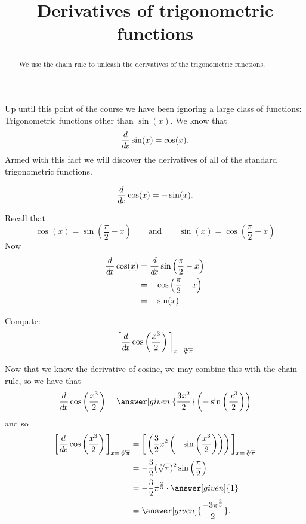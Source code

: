 \documentclass{ximera}
\title[Dig-In:]{Derivatives of trigonometric functions}
\begin{document}
\begin{abstract}
  We use the chain rule to unleash the derivatives of the
  trigonometric functions.
\end{abstract}
\maketitle


Up until this point of the course we have been ignoring a large class
of functions: Trigonometric functions other than $\sin(x)$. We know
that
\[
\frac{d}{\mathop{}\!d\! x} \sin(x) = \cos(x).
\]
Armed with this fact we will discover the derivatives of all of the
standard trigonometric functions.



\begin{theorem}
\[
\frac{d}{\mathop{}\!d\! x} \cos(x) = -\sin(x).
\]
\begin{explanation}
Recall that
\[
\cos(x) = \sin\left(\frac{\pi}{2}-x\right)\qquad\text{and}\qquad \sin(x) = \cos\left(\frac{\pi}{2}-x\right)
\]
Now
\begin{align*}
\frac{d}{\mathop{}\!d\! x} \cos(x) &= \frac{d}{\mathop{}\!d\! x} \sin\left(\frac{\pi}{2}-x\right)\\
&=-\cos\left(\frac{\pi}{2}-x\right) \\
&= -\sin(x).
\end{align*}
\end{explanation}
\end{theorem}

\begin{example}
Compute:
\[
\bigg[ \frac{d}{\mathop{}\!d\! x} \cos \left( \frac{x^3}{2} \right) \bigg]_{x=\sqrt[3]{\pi}}
\]
\begin{explanation}
Now that we know the derivative of cosine, we may combine this with the
chain rule, so we have that
\[
\ddx \cos \left( \frac{x^3}{2} \right) = \answer[given]{\frac{3 x^2}{2}} \left(- \sin \left( \frac{x^3}{2} \right) \right)
\]
and so
\begin{align*}
\eval{\ddx \cos \left( \frac{x^3}{2} \right)}_{x=\sqrt[3]{\pi}} &= \eval{\left( \frac{3}{2} x^2 \left(- \sin \left( \frac{x^3}{2} \right) \right) \right)}_{x=\sqrt[3]{\pi}}  \\
&= - \frac{3}{2} (\sqrt[3]{\pi})^2 \sin \left( \frac{\pi}{2} \right)  \\
&= - \frac{3}{2} \pi^{\frac{2}{3}} \cdot \answer[given]{1}  \\
&= \answer[given]{\frac{-3 \pi^{\frac{2}{3}}}{2}}.
\end{align*}
\end{explanation}
\end{example}
\end{document}
